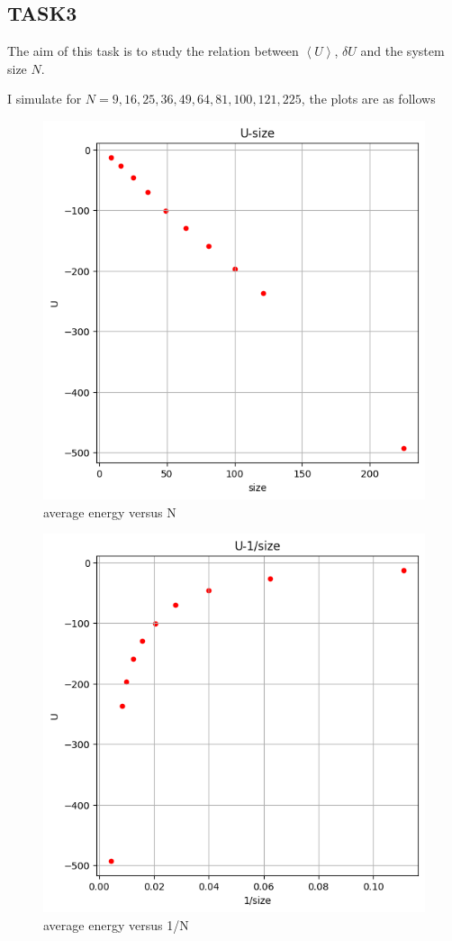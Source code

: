 \documentclass[letterpaper,12pt]{article}
\numberwithin{equation}{section}
\begin{document}
\subsection{TASK3}
The aim of this task is to study the relation between $\left\langle U\right\rangle$, $\delta U$ and the system size $N$. 

I simulate for $N=9,16,25,36,49,64,81,100,121,225$, the plots are as follows
\begin{figure}[H]
    \centering
    \includegraphics{Project/U-size1.png}
    \caption{average energy versus N}
    \label{fig:U-size1}
\end{figure}
\begin{figure}[H]
    \centering
    \includegraphics{Project/U-size.png}
    \caption{average energy versus 1/N}
    \label{fig:U-size}
\end{figure}
\end{document}
